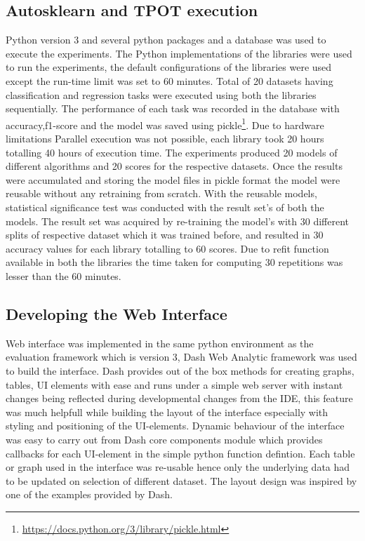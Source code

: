 \subsection{Autosklearn and TPOT execution}
Python version 3 and several python packages and a database was used to execute the experiments.
The Python implementations of the libraries were used to run the experiments, the default configurations of the libraries were used except the run-time limit was set to 60 minutes. Total of 20 datasets having classification and regression tasks were executed using both the libraries sequentially. The performance of each task was recorded in the database with accuracy,f1-score and the model was saved using pickle\footnote{\url{https://docs.python.org/3/library/pickle.html}}. Due to hardware limitations Parallel execution was not possible, each library took 20 hours totalling 40 hours of execution time. The experiments produced 20 models of different algorithms and 20 scores for the respective datasets. Once the results were accumulated and storing the model files in pickle format the model were reusable without any retraining from scratch. With the reusable models, statistical significance test was conducted with the result set's of both the models. The result set was acquired by re-training the model's with 30 different splits of respective dataset which it was trained before, and resulted in 30 accuracy values for each library totalling to 60 scores. Due to refit function available in both the libraries the time taken for computing 30 repetitions was lesser than the 60 minutes.

\subsection{Developing the Web Interface}
Web interface was implemented in the same python environment as the evaluation framework which is version 3, Dash Web Analytic framework was used to build the interface. Dash provides out of the box methods for creating graphs, tables, UI elements with ease and runs under a simple web server with instant changes being reflected during developmental changes from the IDE, this feature was much helpfull while building the layout of the interface especially with styling and positioning of the UI-elements. Dynamic behaviour of the interface was easy to carry out from Dash core components module which provides callbacks for each UI-element in the simple python function defintion. Each table or graph used in the interface was re-usable hence only the underlying data had to be updated on selection of different dataset. The layout design was inspired by one of the examples provided by Dash.